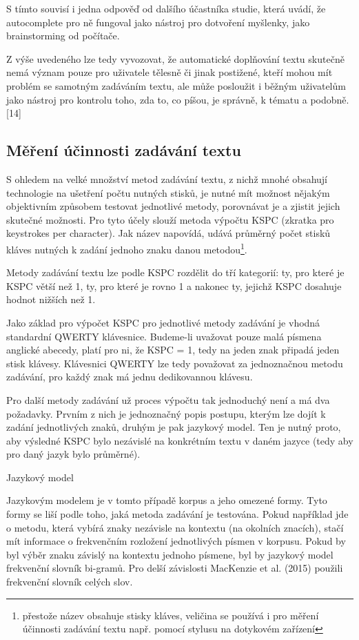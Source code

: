 \documentclass{article}
\begin{document}
S tímto souvisí i jedna odpověď od dalšího účastníka studie, která uvádí, že autocomplete pro ně fungoval jako nástroj pro dotvoření myšlenky, jako brainstorming od počítače. 

Z výše uvedeného lze tedy vyvozovat, že automatické doplňování textu skutečně nemá význam pouze pro uživatele tělesně či jinak postižené, kteří mohou mít problém se samotným zadáváním textu, ale může posloužit i běžným uživatelům jako nástroj pro kontrolu toho, zda to, co píšou, je správně, k tématu a podobně. [14]

\subsection{Měření účinnosti zadávání textu}

S ohledem na velké množství metod zadávání textu, z nichž mnohé obsahují technologie na ušetření počtu nutných stisků, je nutné mít možnost nějakým objektivním způsobem testovat jednotlivé metody, porovnávat je a zjistit jejich skutečné možnosti. Pro tyto účely slouží metoda výpočtu KSPC (zkratka pro keystrokes per character). Jak název napovídá, udává průměrný počet stisků kláves nutných k zadání jednoho znaku danou metodou\footnote{přestože název obsahuje stisky kláves, veličina se používá i pro měření účinnosti zadávání textu např. pomocí stylusu na dotykovém zařízení}.

Metody zadávání textu lze podle KSPC rozdělit do tří kategorií: ty, pro které je KSPC větší než 1, ty, pro které je rovno 1 a nakonec ty, jejichž KSPC dosahuje hodnot nižších než 1.

Jako základ pro výpočet KSPC pro jednotlivé metody zadávání je vhodná standardní QWERTY klávesnice. Budeme-li uvažovat pouze malá písmena anglické abecedy, platí pro ni, že KSPC = 1, tedy na jeden znak připadá jeden stisk klávesy. Klávesnici QWERTY lze tedy považovat za jednoznačnou metodu zadávání, pro každý znak má jednu dedikovannou klávesu.

Pro další metody zadávání už proces výpočtu tak jednoduchý není a má dva požadavky. Prvním z nich je jednoznačný popis postupu, kterým lze dojít k zadání jednotlivých znaků, druhým je pak jazykový model. Ten je nutný proto, aby výsledné KSPC bylo nezávislé na konkrétním textu v daném jazyce (tedy aby pro daný jazyk bylo průměrné).

Jazykový model

Jazykovým modelem je v tomto případě korpus a jeho omezené formy. Tyto formy se liší podle toho, jaká metoda zadávání je testována. Pokud například jde o metodu, která vybírá znaky nezávisle na kontextu (na okolních znacích), stačí mít informace o frekvenčním rozložení jednotlivých písmen v korpusu. Pokud by byl výběr znaku závislý na kontextu jednoho písmene, byl by jazykový model frekvenční slovník bi-gramů. Pro delší závislosti MacKenzie et al. (2015) použili frekvenční slovník celých slov.
\end{document}
